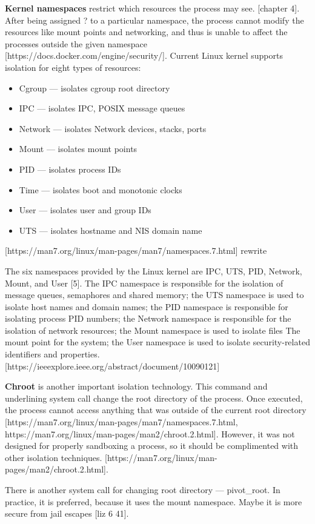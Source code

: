 \textbf{Kernel namespaces} restrict which resources the process may see. [chapter 4]. After being assigned ? to a particular namespace, the process cannot modify the resources like mount points and networking, and thus is unable to affect the processes outside the given namespace [https://docs.docker.com/engine/security/]. Current Linux kernel supports isolation for eight types of resources:
\begin{itemize}
    \item Cgroup — isolates cgroup root directory
    \item IPC — isolates IPC, POSIX message queues
    \item Network — isolates Network devices, stacks, ports
    \item Mount — isolates mount points
    \item PID — isolates process IDs
    \item Time — isolates boot and monotonic clocks
    \item User — isolates user and group IDs
    \item UTS — isolates hostname and NIS domain name
\end{itemize}
[https://man7.org/linux/man-pages/man7/namespaces.7.html]
rewrite

The six namespaces provided by the Linux kernel are IPC, UTS, PID, Network, Mount, and User [5]. The IPC namespace is responsible for the isolation of message queues, semaphores and shared memory; the UTS namespace is used to isolate host names and domain names; the PID namespace is responsible for isolating process PID numbers; the Network namespace is responsible for the isolation of network resources; the Mount namespace is used to isolate files The mount point for the system; the User namespace is used to isolate security-related identifiers and properties. [https://ieeexplore.ieee.org/abstract/document/10090121]

\textbf{Chroot} is another important isolation technology. This command and underlining system call change the root directory of the process. Once executed, the process cannot access anything that was outside of the current root directory [https://man7.org/linux/man-pages/man7/namespaces.7.html, https://man7.org/linux/man-pages/man2/chroot.2.html]. However, it was not designed for properly sandboxing a process, so it should be complimented with other isolation techniques. [https://man7.org/linux/man-pages/man2/chroot.2.html]. 

There is another system call for changing root directory — pivot\_root. In practice, it is preferred, because it uses the mount namespace. Maybe it is more secure from jail escapes [liz 6 41]. 





\clearpage